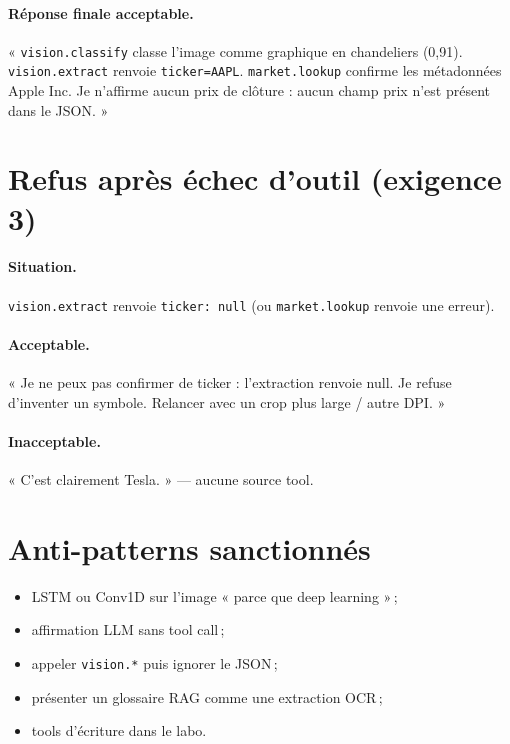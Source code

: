 \documentclass[11pt,a4paper]{article}
\begin{document}
\paragraph{Réponse finale acceptable.}
« \texttt{vision.classify} classe l'image comme graphique en chandeliers (0{,}91).
\texttt{vision.extract} renvoie \texttt{ticker=AAPL}.
\texttt{market.lookup} confirme les métadonnées Apple Inc.
Je n'affirme aucun prix de clôture : aucun champ prix n'est présent dans le JSON. »

\section{Refus après échec d'outil (exigence 3)}

\paragraph{Situation.} \texttt{vision.extract} renvoie \texttt{ticker: null}
(ou \texttt{market.lookup} renvoie une erreur).

\paragraph{Acceptable.}
« Je ne peux pas confirmer de ticker : l'extraction renvoie null.
Je refuse d'inventer un symbole. Relancer avec un crop plus large / autre DPI. »

\paragraph{Inacceptable.}
« C'est clairement Tesla. » --- aucune source tool.

\section{Anti-patterns sanctionnés}

\begin{itemize}
  \item LSTM ou Conv1D sur l'image « parce que deep learning »\,;
  \item affirmation LLM sans tool call\,;
  \item appeler \texttt{vision.*} puis ignorer le JSON\,;
  \item présenter un glossaire RAG comme une extraction OCR\,;
  \item tools d'écriture dans le labo.
\end{itemize}
\end{document}
